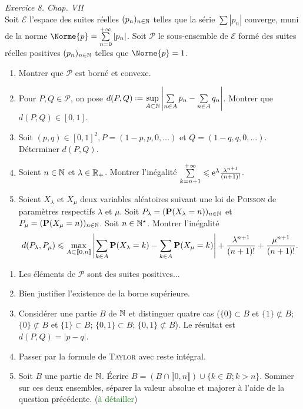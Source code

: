 \begin{exercice}
\emph{Exercice 8. Chap. VII} \\
Soit $\mathscr{E}$ l'espace des suites réelles $(p_n)_{n \in \N}$ telles que la série $\sum |p_n|$ converge, muni de la norme $\Norme{p} = \sum\limits_{n=0}^{+\infty} |p_n|$. Soit $\mathscr{P}$ le sous-ensemble de $\mathscr{E}$ formé des suites réelles positives $(p_n)_{n \in \N}$ telles que $\Norme{p}=1$.
\begin{enumerate}
    \item Montrer que $\mathscr{P}$ est borné et convexe. \\
    \item Pour $P, Q \in \mathscr{P}$, on pose $d(P, Q) \defeq \sup\limits_{A \subset \N} \left| \sum\limits_{n \in A} p_n - \sum\limits_{n \in A} q_n \right|$. Montrer que $d(P,Q) \in [0,1]$.
    \item Soit $(p,q) \in [0, 1]^2, P = (1-p, p, 0, \dots)$ et $Q = (1-q, q, 0, \dots)$. Déterminer $d(P, Q)$.
    \item Soient $n \in \N$ et $\lambda \in \Rp$. Montrer l'inégalité $\sum\limits_{k=n+1}^{+\infty} \leqslant \me^{\lambda} \frac{\lambda^{n+1}}{(n+1)!}$.
    \item Soient $X_\lambda$ et $X_\mu$ deux variables aléatoires suivant une loi de \textsc{Poisson} de paramètres respectifs $\lambda$ et $\mu$. Soit $P_\lambda = (\P(X_\lambda=n))_{n \in \N}$ et $P_\mu = (\P(X_\mu=n))_{n \in \N}$. Soit $n \in \Ne$. Montrer l'inégalité
    $$d(P_\lambda, P_\mu) \leqslant \max_{A \subset \llbracket 0, n \rrbracket} \left| \sum_{k \in A} \P(X_\lambda=k) - \sum_{k \in A} \P(X_\mu=k) \right| + \frac{\lambda^{n+1}}{(n+1)!} + \frac{\mu^{n+1}}{(n+1)!}.$$
\end{enumerate}
\end{exercice}


\begin{enumerate}
    \item Les éléments de $\mathscr{P}$ sont des suites positives...
    \item Bien justifier l'existence de la borne supérieure.
    \item Considérer une partie $B$ de $\N$ et distinguer quatre cas ($\{0\} \subset B$ et $\{1\} \not\subset B$; $\{0\} \not\subset B$ et $\{1\} \subset B$; $\{0, 1\} \subset B$; $ \{0, 1\} \not\subset B$). Le résultat est $d(P, Q) = |p-q|$.
    \item Passer par la formule de \textsc{Taylor} avec reste intégral.
    \item Soit $B$ une partie de $\N$. Écrire $B = \left(B \cap \llbracket0, n \rrbracket \right) \cup \{k \in B; k > n\}$. Sommer sur ces deux ensembles, séparer la valeur absolue et majorer à l'aide de la question précédente. (\textcolor{green}{à détailler})
\end{enumerate}